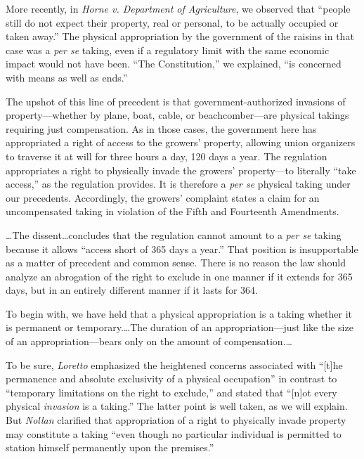More recently, in \textit{Horne v. Department of Agriculture}, we
observed that ``people still do not expect their property, real or personal, to
be actually occupied or taken away.'' The physical appropriation by the
government of the raisins in that case was a \textit{per se} taking, even if a
regulatory limit with the same economic impact would not have been. ``The
Constitution,'' we explained, ``is concerned with means as well as ends.'' 


The upshot of this line of precedent is that government-authorized invasions of
property---whether by plane, boat, cable, or beachcomber---are physical takings
requiring just compensation. As in those cases, the government here has
appropriated a right of access to the growers' property, allowing union
organizers to traverse it at will for three hours a day, 120 days a year. The
regulation appropriates a right to physically invade the growers' property---to
literally ``take access,'' as the regulation provides. It is therefore a
\textit{per se} physical taking under our precedents. Accordingly, the growers'
complaint states a claim for an uncompensated taking in violation of the Fifth
and Fourteenth Amendments.



\ldots The dissent\ldots concludes that the regulation cannot amount to a
\textit{per se} taking because it allows ``access short of 365 days a year.''
That position is insupportable as a matter of precedent and common sense. There
is no reason the law should analyze an abrogation of the right to exclude in one
manner if it extends for 365 days, but in an entirely different manner if it
lasts for 364.


To begin with, we have held that a physical appropriation is a taking whether it
is permanent or temporary.\ldots The duration of an appropriation---just like
the size of an appropriation---bears only on the amount of compensation.\ldots


To be sure, \textit{Loretto} emphasized the heightened concerns associated with
``[t]he permanence and absolute exclusivity of a physical occupation'' in
contrast to ``temporary limitations on the right to exclude,'' and stated that
``[n]ot every physical \textit{invasion} is a taking.'' The latter point is well
taken, as we will explain. But \textit{Nollan} clarified that appropriation of a
right to physically invade property may constitute a taking ``even though no
particular individual is permitted to station himself permanently upon the
premises.'' 


